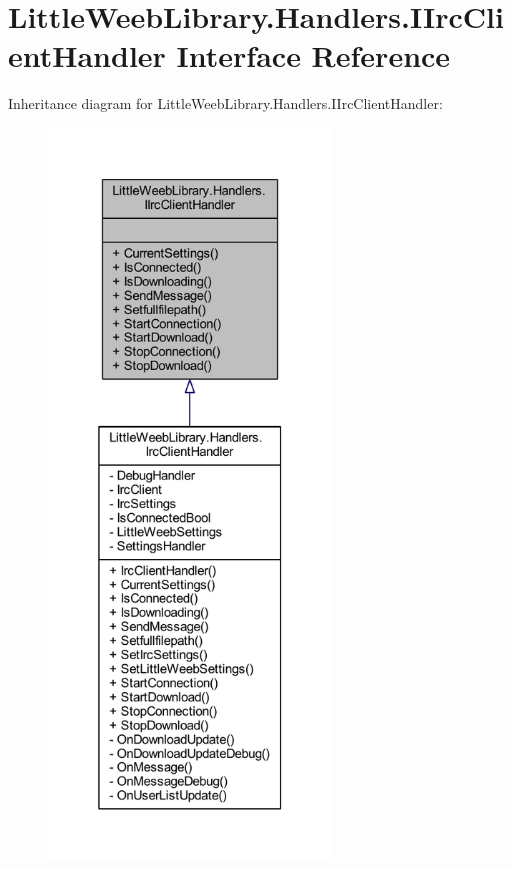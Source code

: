 \hypertarget{interface_little_weeb_library_1_1_handlers_1_1_i_irc_client_handler}{}\section{Little\+Weeb\+Library.\+Handlers.\+I\+Irc\+Client\+Handler Interface Reference}
\label{interface_little_weeb_library_1_1_handlers_1_1_i_irc_client_handler}


Inheritance diagram for Little\+Weeb\+Library.\+Handlers.\+I\+Irc\+Client\+Handler\+:\nopagebreak
\begin{figure}[H]
\begin{center}
\leavevmode
\includegraphics[height=550pt]{interface_little_weeb_library_1_1_handlers_1_1_i_irc_client_handler__inherit__graph}
\end{center}
\end{figure}



